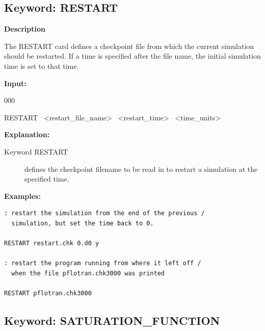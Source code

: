 \subsection{Keyword: RESTART}

\hfill\hyperlink{target_key}{\return}

{\noindent\bf Description}

The RESTART card defines a checkpoint file from which the current simulation should be restarted.  If a time is specified after the file name, the initial simulation time is set to that time.

{\noindent\bf Input:}

\begin{deflist}{000}
\item[RESTART] \ <restart\_file\_name> \ <restart\_time> \ <time\_units>
\end{deflist}

{\noindent\bf Explanation:}
\begin{description}
\item[Keyword RESTART] defines the checkpoint filename to be read in to restart a simulation at the specified time.
\end{description}

{\noindent\bf
Examples:}

\begin{mdframed}
\footnotesize

\begin{verbatim}
: restart the simulation from the end of the previous /
  simulation, but set the time back to 0.

RESTART restart.chk 0.d0 y

: restart the program running from where it left off /
  when the file pflotran.chk3000 was printed

RESTART pflotran.chk3000

\end{verbatim}
\normalsize
\end{mdframed}

\hyperlink{target_key}{\return}


\newpage
\protect\hypertarget{target_sat}{}

\subsection{Keyword: SATURATION\_FUNCTION}

